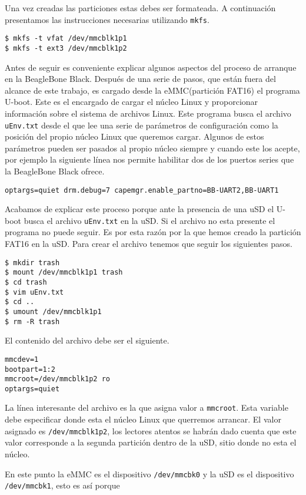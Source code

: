 		Una vez creadas las particiones estas debes ser formateada. A continuación presentamos las instrucciones necesarias utilizando
		\texttt{mkfs}.
		\begin{lstlisting}[style=myBash]
$ mkfs -t vfat /dev/mmcblk1p1
$ mkfs -t ext3 /dev/mmcblk1p2
		\end{lstlisting}
		Antes de seguir es conveniente explicar algunos aspectos del proceso de arranque en la BeagleBone Black. Después de una serie de
		pasos, que están fuera del alcance de este trabajo, es cargado desde la eMMC(partición FAT16) el programa U-boot. Este es el encargado
		de cargar el núcleo Linux y proporcionar información sobre el sistema de archivos Linux. Este programa busca el archivo
		\texttt{uEnv.txt} desde el que lee una serie de parámetros de configuración como la posición del propio núcleo Linux que queremos
		cargar. Algunos de estos parámetros pueden ser pasados al propio núcleo siempre y cuando este los acepte, por ejemplo la siguiente
		línea nos permite habilitar dos de los puertos series que la BeagleBone Black ofrece.
		\begin{lstlisting}[style=myFile]
optargs=quiet drm.debug=7 capemgr.enable_partno=BB-UART2,BB-UART1
		\end{lstlisting}
		Acabamos de explicar este proceso porque ante la presencia de una uSD el U-boot busca el archivo \texttt{uEnv.txt} en la uSD. Si el
		archivo no esta presente el programa no puede seguir. Es por esta razón por la que hemos creado la partición FAT16 en la uSD. Para
		crear el archivo tenemos que seguir los siguientes pasos.
		\begin{lstlisting}[style=myBash]
$ mkdir trash
$ mount /dev/mmcblk1p1 trash
$ cd trash
$ vim uEnv.txt
$ cd ..
$ umount /dev/mmcblk1p1
$ rm -R trash
		\end{lstlisting}
		El contenido del archivo debe ser el siguiente.
		\begin{lstlisting}[style=myFile]
mmcdev=1
bootpart=1:2
mmcroot=/dev/mmcblk1p2 ro
optargs=quiet 
		\end{lstlisting}
		La línea interesante del archivo es la que asigna valor a \texttt{mmcroot}. Esta variable debe especificar donde esta el núcleo Linux
		que querremos arrancar. El valor asignado es \texttt{/dev/mmcblk1p2}, los lectores atentos se habrán dado cuenta que este valor
		corresponde a la segunda partición dentro de la uSD, sitio donde no esta el núcleo.
		\par 
		En este punto la eMMC es el dispositivo \texttt{/dev/mmcbk0} y la uSD es el dispositivo \texttt{/dev/mmcbk1}, esto es así porque
